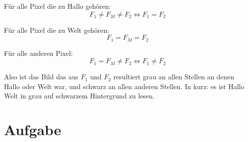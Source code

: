 \documentclass[DIN, pagenumber=false, fontsize=11pt, parskip=half]{scrartcl}
\begin{document}
    Für alle Pixel die zu \glqq{}Hallo\grqq{} gehören:
    \begin{equation*}
        F_1 \neq F_M \neq F_2 \Leftrightarrow F_1 = F_2
    \end{equation*}

    Für alle Pixel die zu \glqq{}Welt\grqq{} gehören:
    \begin{equation*}
        F_1 = F_M = F_2
    \end{equation*}

    Für alle anderen Pixel:
    \begin{equation*}
        F_1 = F_M \neq F_2 \Leftrightarrow F_1 \neq F_2
    \end{equation*}

    Also ist das Bild das aus $F_1$ und $F_2$ resultiert grau an allen Stellen
    an denen \glqq{}Hallo\grqq{} oder \glqq{}Welt\grqq{} war, und schwarz an
    allen anderen Stellen. In kurz: es ist \glqq{}Hallo Welt\grqq{} in grau
    auf schwarzem Hintergrund zu lesen.

    \section{Aufgabe}
\end{document}
